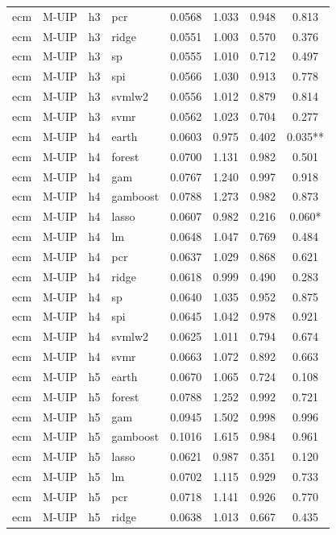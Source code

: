 \begin{ThreePartTable}
\begin{longtable}[t]{llclcccc}
ecm & M-UIP & h3 & pcr & 0.0568 & 1.033 & 0.948 & 0.813\\
ecm & M-UIP & h3 & ridge & 0.0551 & 1.003 & 0.570 & 0.376\\
ecm & M-UIP & h3 & sp & 0.0555 & 1.010 & 0.712 & 0.497\\
ecm & M-UIP & h3 & spi & 0.0566 & 1.030 & 0.913 & 0.778\\
ecm & M-UIP & h3 & svmlw2 & 0.0556 & 1.012 & 0.879 & 0.814\\
ecm & M-UIP & h3 & svmr & 0.0562 & 1.023 & 0.704 & 0.277\\
\addlinespace
ecm & M-UIP & h4 & earth & 0.0603 & 0.975 & 0.402 & 0.035**\\
ecm & M-UIP & h4 & forest & 0.0700 & 1.131 & 0.982 & 0.501\\
ecm & M-UIP & h4 & gam & 0.0767 & 1.240 & 0.997 & 0.918\\
ecm & M-UIP & h4 & gamboost & 0.0788 & 1.273 & 0.982 & 0.873\\
ecm & M-UIP & h4 & lasso & 0.0607 & 0.982 & 0.216 & 0.060*\\
ecm & M-UIP & h4 & lm & 0.0648 & 1.047 & 0.769 & 0.484\\
ecm & M-UIP & h4 & pcr & 0.0637 & 1.029 & 0.868 & 0.621\\
ecm & M-UIP & h4 & ridge & 0.0618 & 0.999 & 0.490 & 0.283\\
ecm & M-UIP & h4 & sp & 0.0640 & 1.035 & 0.952 & 0.875\\
ecm & M-UIP & h4 & spi & 0.0645 & 1.042 & 0.978 & 0.921\\
ecm & M-UIP & h4 & svmlw2 & 0.0625 & 1.011 & 0.794 & 0.674\\
ecm & M-UIP & h4 & svmr & 0.0663 & 1.072 & 0.892 & 0.663\\
\addlinespace
ecm & M-UIP & h5 & earth & 0.0670 & 1.065 & 0.724 & 0.108\\
ecm & M-UIP & h5 & forest & 0.0788 & 1.252 & 0.992 & 0.721\\
ecm & M-UIP & h5 & gam & 0.0945 & 1.502 & 0.998 & 0.996\\
ecm & M-UIP & h5 & gamboost & 0.1016 & 1.615 & 0.984 & 0.961\\
ecm & M-UIP & h5 & lasso & 0.0621 & 0.987 & 0.351 & 0.120\\
ecm & M-UIP & h5 & lm & 0.0702 & 1.115 & 0.929 & 0.733\\
ecm & M-UIP & h5 & pcr & 0.0718 & 1.141 & 0.926 & 0.770\\
ecm & M-UIP & h5 & ridge & 0.0638 & 1.013 & 0.667 & 0.435\\

\end{longtable}
\end{ThreePartTable}
